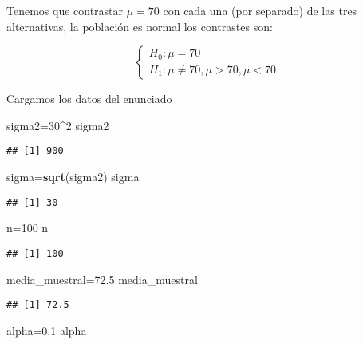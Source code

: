 \documentclass[
]{article}
\newenvironment{Shaded}{\begin{snugshade}}{\end{snugshade}}
\newcommand{\DecValTok}[1]{\textcolor[rgb]{0.00,0.00,0.81}{#1}}
\newcommand{\FloatTok}[1]{\textcolor[rgb]{0.00,0.00,0.81}{#1}}
\newcommand{\KeywordTok}[1]{\textcolor[rgb]{0.13,0.29,0.53}{\textbf{#1}}}
\newcommand{\NormalTok}[1]{#1}
\newcommand{\OperatorTok}[1]{\textcolor[rgb]{0.81,0.36,0.00}{\textbf{#1}}}
\begin{document}
Tenemos que contrastar \(\mu=70\) con cada una (por separado) de las
tres alternativas, la población es normal los contrastes son:

\[
\left\{
\begin{array}{ll}
H_{0}:\mu=70\\
H_{1}:\mu\not= 70, \mu>70 , \mu<70
\end{array}
\right.
\]

Cargamos los datos del enunciado

\begin{Shaded}
\begin{Highlighting}[]
\NormalTok{sigma2=}\DecValTok{30}\OperatorTok{^}\DecValTok{2}
\NormalTok{sigma2}
\end{Highlighting}
\end{Shaded}

\begin{verbatim}
## [1] 900
\end{verbatim}

\begin{Shaded}
\begin{Highlighting}[]
\NormalTok{sigma=}\KeywordTok{sqrt}\NormalTok{(sigma2)}
\NormalTok{sigma}
\end{Highlighting}
\end{Shaded}

\begin{verbatim}
## [1] 30
\end{verbatim}

\begin{Shaded}
\begin{Highlighting}[]
\NormalTok{n=}\DecValTok{100}
\NormalTok{n}
\end{Highlighting}
\end{Shaded}

\begin{verbatim}
## [1] 100
\end{verbatim}

\begin{Shaded}
\begin{Highlighting}[]
\NormalTok{media_muestral=}\FloatTok{72.5}
\NormalTok{media_muestral}
\end{Highlighting}
\end{Shaded}

\begin{verbatim}
## [1] 72.5
\end{verbatim}

\begin{Shaded}
\begin{Highlighting}[]
\NormalTok{alpha=}\FloatTok{0.1}
\NormalTok{alpha}
\end{Highlighting}
\end{Shaded}
\end{document}
